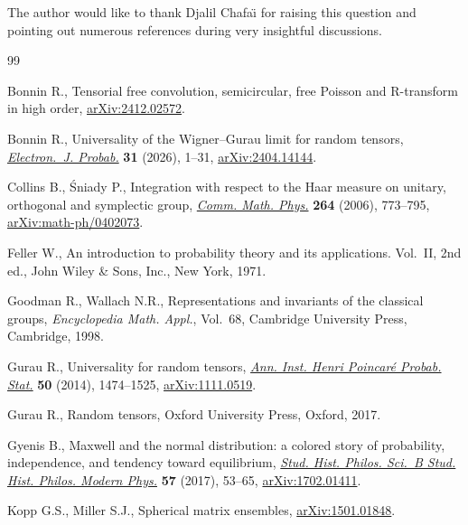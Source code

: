 \documentclass[pdftex]{sigma}
\numberwithin{equation}{section}
\theoremstyle{definition}
\begin{document}
The author would like to thank Djalil Chafa\"{\i} for raising this question and pointing out numerous references during very insightful discussions.

\begin{thebibliography}{99}
\footnotesize\itemsep=0pt

Bonnin R., Tensorial free convolution, semicircular, free {P}oisson and
  {R}-transform in high order,
  \href{http://arxiv.org/abs/2412.02572}{arXiv:2412.02572}.

Bonnin R., Universality of the {W}igner--{G}urau limit for random tensors,
  \href{https://doi.org/10.1214/26-ejp1500}{\textit{Electron.~J. Probab.}}
  \textbf{31} (2026), 1--31,
  \href{http://arxiv.org/abs/2404.14144}{arXiv:2404.14144}.

Collins B., \'Sniady P., Integration with respect to the {H}aar measure on
  unitary, orthogonal and symplectic group,
  \href{https://doi.org/10.1007/s00220-006-1554-3}{\textit{Comm. Math. Phys.}}
  \textbf{264} (2006), 773--795,
  \href{http://arxiv.org/abs/math-ph/0402073}{arXiv:math-ph/0402073}.

Feller W., An introduction to probability theory and its applications.
  {V}ol.~{II}, 2nd ed., John Wiley \& Sons, Inc., New York, 1971.

Goodman R., Wallach N.R., Representations and invariants of the classical
  groups, \textit{Encyclopedia Math. Appl.}, Vol.~68, Cambridge University
  Press, Cambridge, 1998.

Gurau R., Universality for random tensors,
  \href{https://doi.org/10.1214/13-AIHP567}{\textit{Ann. Inst. Henri Poincar\'e
  Probab. Stat.}} \textbf{50} (2014), 1474--1525,
  \href{http://arxiv.org/abs/1111.0519}{arXiv:1111.0519}.

Gurau R., Random tensors, Oxford University Press, Oxford, 2017.

Gyenis B., Maxwell and the normal distribution: a colored story of probability,
  independence, and tendency toward equilibrium,
  \href{https://doi.org/10.1016/j.shpsb.2017.01.001}{\textit{Stud. Hist.
  Philos. Sci.~B Stud. Hist. Philos. Modern Phys.}} \textbf{57} (2017), 53--65,
  \href{http://arxiv.org/abs/1702.01411}{arXiv:1702.01411}.

Kopp G.S., Miller S.J., Spherical matrix ensembles,
  \href{http://arxiv.org/abs/1501.01848}{arXiv:1501.01848}.


\end{thebibliography}
\end{document}
